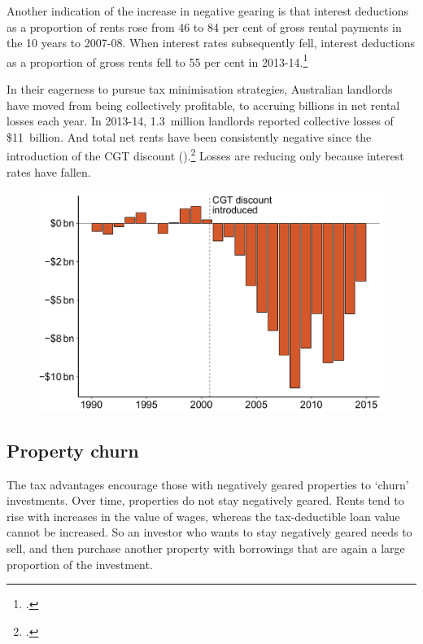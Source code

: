Another indication of the increase in negative gearing is that interest deductions as a proportion of rents rose from 46 to 84 per cent of gross rental payments in the 10 years to 2007-08. 
When interest rates subsequently fell, interest deductions as a proportion of gross rents fell to 55 per cent in 2013-14.\footcite[][65]{Treasury2015ReThink}


In their eagerness to pursue tax minimisation strategies, Australian landlords have moved from being collectively profitable, to accruing billions in net rental losses each year.
In 2013-14, 1.3~million landlords reported collective losses of \$11~billion. 
And total net rents have been consistently negative since the introduction of the CGT discount ().\footcites{Eslake2013}{ATOTaxstats201314}  
Losses are reducing only because interest rates have fallen.

\begin{figure}

\includegraphics[width=\columnwidth]{CGT-NG-atlas//Net-rent-time-series-1}

\end{figure}

\subsection{Property churn}
The tax advantages encourage those with negatively geared properties to ‘churn’ investments. Over time, properties do not stay negatively geared. Rents tend to rise with increases in the value of wages, whereas the tax-deductible loan value cannot be increased.  So an investor who wants to stay negatively geared needs to sell, and then purchase another property with borrowings that are again a large proportion of the investment.

